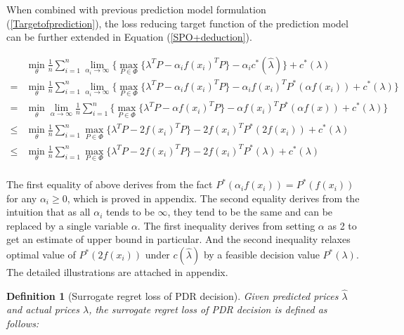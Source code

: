 \documentclass[journal]{IEEEtran}
\newtheorem{definition}{Definition}
\begin{document}
When combined with previous prediction model formulation (\ref{Targetofprediction}), the loss reducing target function of the prediction model can be further extended in Equation (\ref{SPO+deduction}).
\begin{figure*}[!t]
  \begin{equation}
    \label{SPO+deduction}
    \begin{aligned}
      &\min_{\theta} \frac{1}{n} \sum_{i=1}^n \lim_{\alpha_i \to \infty } \Big\{ \max_{P \in \Phi} \{\lambda^T P - \alpha_i f(x_i)^T P \} - \alpha_i c^*(\hat{\lambda}) \Big\}  + c^*(\lambda) \\
      = & \min_{\theta} \frac{1}{n} \sum_{i=1}^n \lim_{\alpha_i \to \infty } \Big\{ \max_{P \in \Phi} \{\lambda^T P - \alpha_i f(x_i)^T P \} - \alpha_i f(x_i)^T P^*(\alpha f(x_i))  + c^*(\lambda) \Big\} \\
      = & \min_{\theta}  \lim_{\alpha \to \infty } \frac{1}{n} \sum_{i=1}^n \Big\{ \max_{P \in \Phi} \{\lambda^T P - \alpha f(x_i)^T P \} - \alpha f(x_i)^T P^*(\alpha f(x))  + c^*(\lambda) \Big\} \\
      \leq & \min_{\theta} \frac{1}{n} \sum_{i=1}^n   \max_{P \in \Phi} \Big\{\lambda^T P - 2 f(x_i)^T P \Big\} - 2 f(x_i)^T P^*(2 f(x_i)) + c^*(\lambda)\\
      \leq & \min_{\theta} \frac{1}{n} \sum_{i=1}^n   \max_{P \in \Phi} \Big\{\lambda^T P - 2 f(x_i)^T P \Big\} - 2 f(x_i)^T P^*(\lambda) + c^*(\lambda) \\ 
    \end{aligned}
  \end{equation}
\end{figure*}
The first equality of above derives from the fact $P^*(\alpha_i f(x_i)) = P^*(f(x_i))$ for any $\alpha_i \geq 0$, which is proved in appendix. The second equality derives from the intuition that as all $\alpha_i$ tends to be $\infty$, they tend to be the same and can be replaced by a single variable $\alpha$. The first inequality derives from setting $\alpha$ as 2 to get an estimate of upper bound in particular. And the second inequality relaxes optimal value of $P^*(2 f(x_i))$ under $c(\hat{\lambda})$  by a feasible decision value $P^*(\lambda)$. The detailed illustrations are attached in appendix.

\begin{definition}[Surrogate regret loss of PDR decision]
Given predicted prices $\hat{\lambda}$ and actual prices $\lambda$, the surrogate regret loss of PDR decision is defined as follows:
\end{definition}
\end{document}
